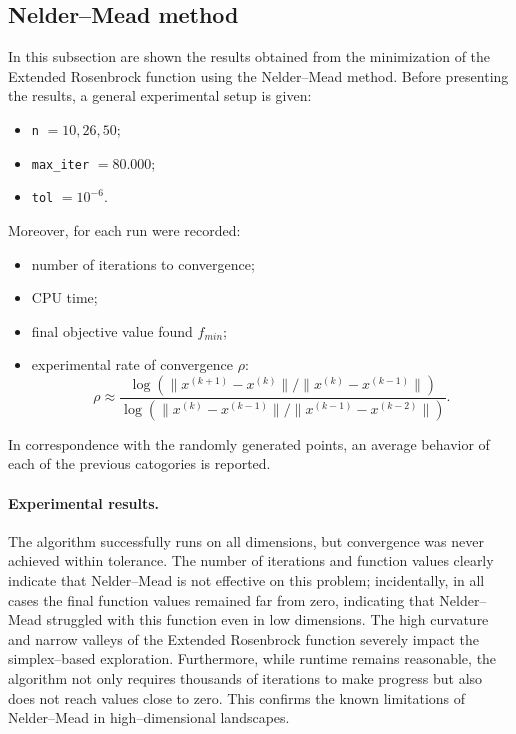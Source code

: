 \documentclass[a4paper,12pt]{article}
\begin{document}
	\newpage
	\subsection{Nelder–Mead method}
	In this subsection are shown the results obtained from the minimization of the Extended Rosenbrock function using the Nelder--Mead method. Before presenting the results, a general experimental setup is given:
	\begin{itemize}
		\item \texttt{n} $= 10, 26, 50$;
		\item \texttt{max\_iter} $= 80.000$;
		\item \texttt{tol} $= 10^{-6}$.
	\end{itemize}
	
	Moreover, for each run were recorded:
	\begin{itemize}
		\item number of iterations to convergence;
		\item CPU time;
		\item final objective value found \(f_{min}\);
		\item experimental rate of convergence \(\rho\):
		\[
		\rho \approx \frac{\log\left(\|x^{(k+1)} - x^{(k)}\|\big/\|x^{(k)} - x^{(k-1)}\|\right)}{\log\left(\|x^{(k)} - x^{(k-1)}\|\big/\|x^{(k-1)} - x^{(k-2)}\|\right)}.
		\]
			\end{itemize}	
	
	In correspondence with the randomly generated points, an average behavior of each of the previous catogories is reported.
	\paragraph{Experimental results.}The algorithm successfully runs on all dimensions, but convergence was never achieved within tolerance. The number of iterations and function values clearly indicate that Nelder–Mead is not effective on this problem; incidentally, in all cases the final function values remained far from zero, indicating that Nelder–Mead struggled with this function even in low dimensions. The high curvature and narrow valleys of the Extended Rosenbrock function severely impact the simplex--based exploration. Furthermore, while runtime remains reasonable, the algorithm not only requires thousands of iterations to make progress but also does not reach values close to zero. This confirms the known limitations of Nelder–Mead in high--dimensional landscapes.
	
\end{document}
